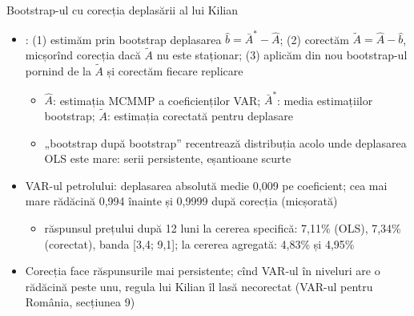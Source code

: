 \begin{frame}{Bootstrap-ul cu corecția deplasării al lui Kilian}
\itemsize{\small}
\begin{itemize}
    \item {}: (1) estimăm prin bootstrap deplasarea $\hat b = \bar A^* - \hat A$; (2) corectăm $\tilde A = \hat A - \hat b$, micșorînd corecția dacă $\tilde A$ nu este staționar; (3) aplicăm din nou bootstrap-ul pornind de la $\tilde A$ și corectăm fiecare replicare
    \begin{itemize}
        \item $\hat A$: estimația MCMMP a coeficienților VAR; $\bar A^*$: media estimațiilor bootstrap; $\tilde A$: estimația corectată pentru deplasare
        \item „bootstrap după bootstrap” recentrează distribuția acolo unde deplasarea OLS este mare: serii persistente, eșantioane scurte
    \end{itemize}
    \item VAR-ul petrolului: deplasarea absolută medie 0{,}009 pe coeficient; cea mai mare rădăcină 0{,}994 înainte și 0{,}9999 după corecția (micșorată)
    \begin{itemize}
        \item răspunsul prețului după 12 luni la cererea specifică: 7{,}11\% (OLS), 7{,}34\% (corectat), banda [3{,}4; 9{,}1]; la cererea agregată: 4{,}83\% și 4{,}95\%
    \end{itemize}
    \item Corecția face răspunsurile mai persistente; cînd VAR-ul în niveluri are o rădăcină peste unu, regula lui Kilian îl lasă necorectat (VAR-ul pentru România, secțiunea 9)
\end{itemize}
\end{frame}

